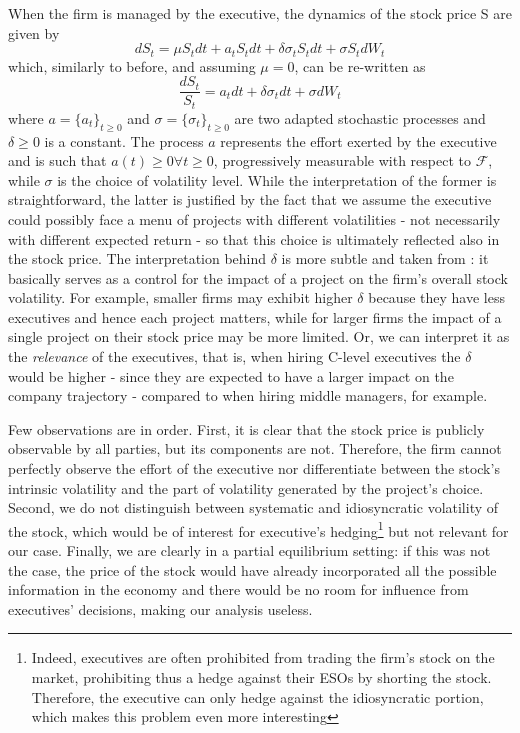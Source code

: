 When the firm is managed by the executive, the dynamics of the stock price S are given by 
$$ dS_t = \mu S_t dt + a_t S_t dt + \delta \sigma_t S_t dt + \sigma S_t dW_t $$
which, similarly to before, and assuming $\mu = 0$, can be re-written as 
$$ \frac{dS_t}{S_t} = a_t dt + \delta \sigma_t dt + \sigma dW_t $$
where $a = \{a_t\}_{t \ge 0}$ and $\sigma = \{\sigma_t\}_{t \ge 0}$ are two adapted stochastic processes and $\delta \ge 0$ is a constant. The process $a$ represents the effort exerted by the executive and is such that $a(t) \ge 0 \forall t \ge 0$, progressively measurable with respect to $\mathscr{F}$, while $\sigma$ is the choice of volatility level. While the interpretation of the former is straightforward, the latter is justified by the fact that we assume the executive could possibly face a menu of projects with different volatilities - not necessarily with different expected return - so that this choice is ultimately reflected also in the stock price. 
The interpretation behind $\delta$ is more subtle and taken from \cite{cadenillas2005executive}: it basically serves as a control for the impact of a project on the firm's overall stock volatility. For example, smaller firms may exhibit higher $\delta$ because they have less executives and hence each project matters, while for larger firms the impact of a single project on their stock price may be more limited. Or, we can interpret it as the \textit{relevance} of the executives, that is, when hiring C-level executives the $\delta$ would be higher - since they are expected to have a larger impact on the company trajectory - compared to when hiring middle managers, for example.

Few observations are in order. First, it is clear that the stock price is publicly observable by all parties, but its components are not. Therefore, the firm cannot perfectly observe the effort of the executive nor differentiate between the stock's intrinsic volatility and the part of volatility generated by the project's choice. Second, we do not distinguish between systematic and idiosyncratic volatility of the stock, which would be of interest for executive's hedging\footnote{Indeed, executives are often prohibited from trading the firm's stock on the market, prohibiting thus a hedge against their ESOs by shorting the stock. Therefore, the executive can only hedge against the idiosyncratic portion, which makes this problem even more interesting} but not relevant for our case. Finally, we are clearly in a partial equilibrium setting: if this was not the case, the price of the stock would have already incorporated all the possible information in the economy and there would be no room for influence from executives' decisions, making our analysis useless.


